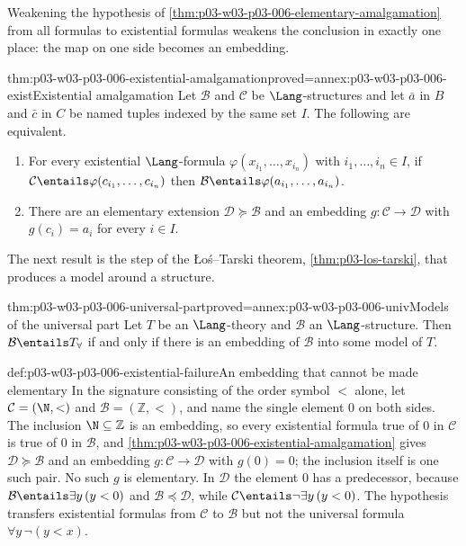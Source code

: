 Weakening the hypothesis of
\cref{thm:p03-w03-p03-006-elementary-amalgamation} from all formulas to
existential formulas weakens the conclusion in exactly one place: the map on
one side becomes an embedding.

\begin{hbtheorem}{thm:p03-w03-p03-006-existential-amalgamation}{proved=annex:p03-w03-p03-006-exist}{Existential amalgamation}
Let \(\mathcal B\) and \(\mathcal C\) be \(\Lang\)-structures and let
\(\bar a\) in \(B\) and \(\bar c\) in \(C\) be named tuples indexed by the
same set \(I\).  The following are equivalent.
\begin{enumerate}
  \item For every existential \(\Lang\)-formula
        \(\varphi(x_{i_1},\ldots,x_{i_n})\) with \(i_1,\ldots,i_n\in I\), if
        \(\mathcal C\entails\varphi(c_{i_1},\ldots,c_{i_n})\) then
        \(\mathcal B\entails\varphi(a_{i_1},\ldots,a_{i_n})\).
  \item There are an elementary extension
        \(\mathcal D\succcurlyeq\mathcal B\) and an embedding
        \(g:\mathcal C\to\mathcal D\) with \(g(c_i)=a_i\) for every
        \(i\in I\).
\end{enumerate}
\end{hbtheorem}

The next result is the step of the \L o\'s--Tarski theorem,
\cref{thm:p03-los-tarski}, that produces a model around a structure.

\begin{hbcorollary}{thm:p03-w03-p03-006-universal-part}{proved=annex:p03-w03-p03-006-univ}{Models of the universal part}
Let \(T\) be an \(\Lang\)-theory and \(\mathcal B\) an \(\Lang\)-structure.
Then \(\mathcal B\entails T_\forall\) if and only if there is an embedding
of \(\mathcal B\) into some model of \(T\).
\end{hbcorollary}

\begin{hbexample}{def:p03-w03-p03-006-existential-failure}{An embedding that cannot be made elementary}
In the signature consisting of the order symbol \(<\) alone, let
\(\mathcal C=(\N,<)\) and \(\mathcal B=(\mathbb Z,<)\), and name the single element \(0\) on both sides.  The inclusion
\(\N\subseteq\mathbb Z\) is an embedding, so every existential formula true
of \(0\) in \(\mathcal C\) is true of \(0\) in \(\mathcal B\), and
\cref{thm:p03-w03-p03-006-existential-amalgamation} gives
\(\mathcal D\succcurlyeq\mathcal B\) and an embedding
\(g:\mathcal C\to\mathcal D\) with \(g(0)=0\); the inclusion itself is one
such pair.  No such \(g\) is elementary.  In \(\mathcal D\) the element
\(0\) has a predecessor, because \(\mathcal B\entails\exists y\,(y<0)\) and
\(\mathcal B\preccurlyeq\mathcal D\), while \(\mathcal C\entails\neg\exists
y\,(y<0)\).  The hypothesis transfers existential formulas from
\(\mathcal C\) to \(\mathcal B\) but not the universal formula
\(\forall y\,\neg(y<x)\).
\end{hbexample}

